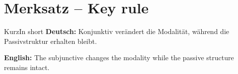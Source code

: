 \documentclass[a4paper,11pt]{article}
\newcommand{\GermanText}[1]{\textbf{Deutsch: }#1\par}
\newcommand{\EnglishText}[1]{{\small\color{SoftGray}\textbf{English: }#1\par}}
\begin{document}
\section{Merksatz -- Key rule}
\begin{grammarentry}{Kurz}{In short}
\GermanText{Konjunktiv verändert die Modalität, während die Passivstruktur erhalten bleibt.}
\EnglishText{The subjunctive changes the modality while the passive structure remains intact.}
\end{grammarentry}
\end{document}
